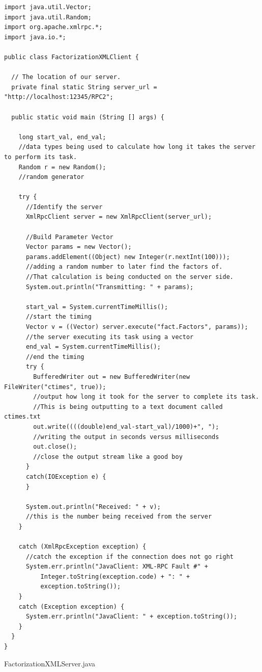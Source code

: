 \documentclass{article}
\begin{document}
\begin{lstlisting}
import java.util.Vector;
import java.util.Random;
import org.apache.xmlrpc.*;
import java.io.*;

public class FactorizationXMLClient {

  // The location of our server.
  private final static String server_url = "http://localhost:12345/RPC2";

  public static void main (String [] args) {

    long start_val, end_val;
    //data types being used to calculate how long it takes the server to perform its task.
    Random r = new Random();
    //random generator

    try {
      //Identify the server
      XmlRpcClient server = new XmlRpcClient(server_url);

      //Build Parameter Vector
      Vector params = new Vector();
      params.addElement((Object) new Integer(r.nextInt(100)));
      //adding a random number to later find the factors of.
      //That calculation is being conducted on the server side.
      System.out.println("Transmitting: " + params);

      start_val = System.currentTimeMillis();
      //start the timing
      Vector v = ((Vector) server.execute("fact.Factors", params));
      //the server executing its task using a vector
      end_val = System.currentTimeMillis();
      //end the timing
      try {
        BufferedWriter out = new BufferedWriter(new FileWriter("ctimes", true));
        //output how long it took for the server to complete its task.
        //This is being outputting to a text document called ctimes.txt
        out.write((((double)end_val-start_val)/1000)+", ");
        //writing the output in seconds versus milliseconds
        out.close();
        //close the output stream like a good boy
      }
      catch(IOException e) {
      }

      System.out.println("Received: " + v);
      //this is the number being received from the server
    }

    catch (XmlRpcException exception) {
      //catch the exception if the connection does not go right
      System.err.println("JavaClient: XML-RPC Fault #" +
          Integer.toString(exception.code) + ": " +
          exception.toString());
    }
    catch (Exception exception) {
      System.err.println("JavaClient: " + exception.toString());
    }
  }
}
\end{lstlisting}

FactorizationXMLServer.java
\end{document}

